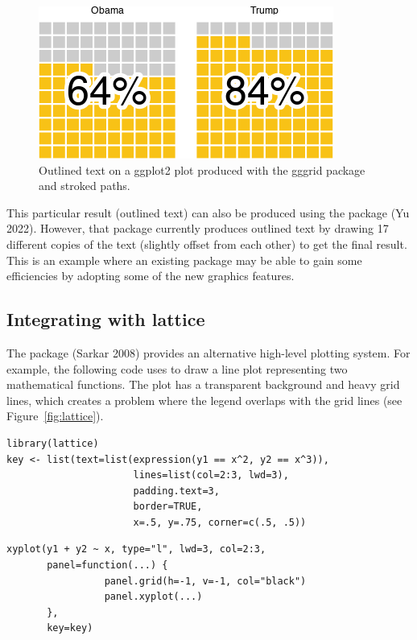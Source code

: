\begin{figure}[h]
\includegraphics{murrell-definitions-2023_files/figure-latex/gggrid-1} \caption{Outlined text on a ggplot2 plot produced with the gggrid package and stroked paths.}\label{fig:gggrid}
\end{figure}

This particular result (outlined text) can also be produced using
the  package (Yu 2022). However, that
package currently produces outlined text by drawing
17 different copies of the text (slightly offset from each other)
to get the final result. This is an example
where an existing package may be able to gain some efficiencies by
adopting some of the new graphics features.

\hypertarget{integrating-with-lattice}{%
\subsection{Integrating with lattice}\label{integrating-with-lattice}}

The  package (Sarkar 2008) provides an alternative
high-level plotting system. For example, the following code
uses  to draw a line plot representing two mathematical functions.
The plot has a transparent background and heavy grid lines, which
creates a problem where the legend overlaps with the grid lines
(see Figure~\ref{fig:lattice}).

\begin{verbatim}
library(lattice)
key <- list(text=list(expression(y1 == x^2, y2 == x^3)),
                      lines=list(col=2:3, lwd=3),
                      padding.text=3,
                      border=TRUE,
                      x=.5, y=.75, corner=c(.5, .5))
\end{verbatim}

\begin{verbatim}
xyplot(y1 + y2 ~ x, type="l", lwd=3, col=2:3,
       panel=function(...) { 
                 panel.grid(h=-1, v=-1, col="black")
                 panel.xyplot(...)
       },
       key=key)
\end{verbatim}

